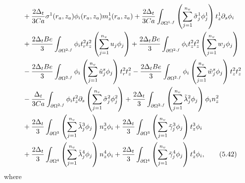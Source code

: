 \documentclass{article}
\begin{document}
\begin{align}
&\quad + \frac{2\Delta_t}{3Ca} \sigma^1(r_a,z_a) \phi_i(r_a,z_a) m_z^{1}(r_a,z_a) + \frac{2\Delta_t}{3Ca} \int_{\partial \Omega^{1,f}} \left( \sum_{j=1}^{n_v} \tilde{\sigma}_j^1 \phi_j^1 \right) t_z^1 \partial_s \phi_i \nonumber\\
&\quad + \frac{2\Delta_t Be}{3} \int_{\partial \Omega^{2,f}} \phi_i t_r^2 t_z^2 \left( \sum_{j=1}^{n_v} u_j \phi_j \right) + \frac{2\Delta_t Be}{3} \int_{\partial \Omega^{2,f}} \phi_i t_z^2 t_z^2 \left( \sum_{j=1}^{n_v} w_j \phi_j \right) \nonumber\\
&\quad - \frac{2\Delta_t Be}{3} \int_{\partial \Omega^{2,f}} \phi_i \left( \sum_{j=1}^{n_v} \tilde{u}_j^s \phi_j \right) t_r^2 t_z^2 - \frac{2\Delta_t Be}{3} \int_{\partial \Omega^{2,f}} \phi_i \left( \sum_{j=1}^{n_v} \tilde{w}_j^s \phi_j \right) t_z^2 t_z^2 \nonumber\\
&\quad - \frac{\Delta_t}{3Ca} \int_{\partial \Omega^{2,f}} \phi_i t_z^2 \partial_s \left( \sum_{j=1}^{n_v} \tilde{\sigma}_j^2 \phi_j^2 \right) + \frac{2\Delta_t}{3} \int_{\partial \Omega^{2,f}} \left( \sum_{j=1}^{n_v} \tilde{\lambda}_j^2 \phi_j \right) \phi_i n_z^2 \nonumber\\
&\quad + \frac{2\Delta_t}{3} \int_{\partial \Omega^{3}} \left( \sum_{j=1}^{n_v} \tilde{\lambda}_j^3 \phi_j \right) n_z^3 \phi_i + \frac{2\Delta_t}{3} \int_{\partial \Omega^{3}} \left( \sum_{j=1}^{n_v} \tilde{\gamma}_j^3 \phi_j \right) t_z^3 \phi_i \nonumber\\
&\quad + \frac{2\Delta_t}{3} \int_{\partial \Omega^{4}} \left( \sum_{j=1}^{n_v} \tilde{\lambda}_j^4 \phi_j \right) n_z^4 \phi_i + \frac{2\Delta_t}{3} \int_{\partial \Omega^{4}} \left( \sum_{j=1}^{n_v} \tilde{\gamma}_j^4 \phi_j \right) t_z^4 \phi_i, \tag{5.42}
\end{align}
where
\end{document}
